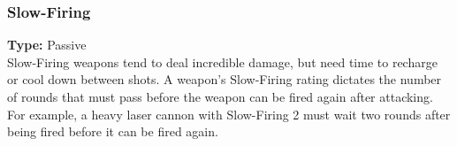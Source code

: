 \subsubsection{Slow-Firing}
\label{iqty:slowfiring}
\textbf{Type:} Passive\\
Slow-Firing weapons tend to deal incredible damage,
but need time to recharge or cool down between shots.
A weapon’s Slow-Firing rating dictates the number of
rounds that must pass before the weapon can be fired
again after attacking. For example, a heavy laser cannon
with Slow-Firing 2 must wait two rounds after being
fired before it can be fired again.
